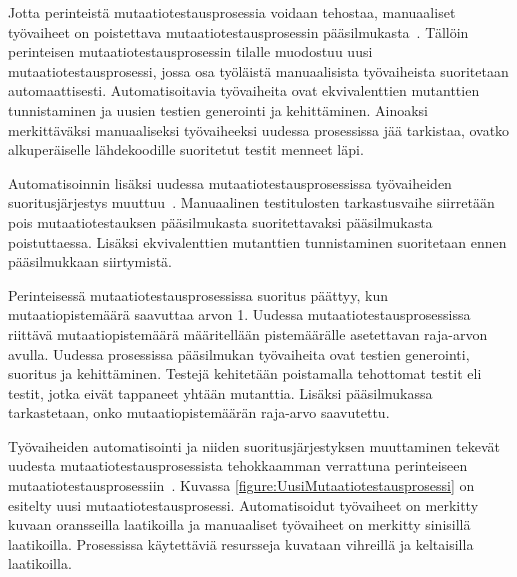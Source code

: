 \documentclass[finnish, grading]{tktltiki2}
\theoremstyle{definition}
\theoremstyle{remark}
\begin{document}
Jotta perinteistä mutaatiotestausprosessia voidaan tehostaa, manuaaliset työvaiheet on poistettava mutaatiotestausprosessin pääsilmukasta~\cite[s. 41]{Offutt:Untch:2001}. Tällöin perinteisen mutaatiotestausprosessin tilalle muodostuu uusi mutaatiotestausprosessi, jossa osa työläistä manuaalisista työvaiheista suoritetaan automaattisesti. Automatisoitavia työvaiheita ovat ekvivalenttien mutanttien tunnistaminen ja uusien testien generointi ja kehittäminen. Ainoaksi merkittäväksi manuaaliseksi työvaiheeksi uudessa prosessissa jää tarkistaa, ovatko alkuperäiselle lähdekoodille suoritetut testit menneet läpi.

Automatisoinnin lisäksi uudessa mutaatiotestausprosessissa työvaiheiden suoritusjärjestys muuttuu~\cite[s. 40]{Offutt:Untch:2001}. Manuaalinen testitulosten tarkastusvaihe siirretään pois mutaatiotestauksen pääsilmukasta suoritettavaksi pääsilmukasta poistuttaessa. Lisäksi ekvivalenttien mutanttien tunnistaminen suoritetaan ennen pääsilmukkaan siirtymistä. 

Perinteisessä mutaatiotestausprosessissa suoritus päättyy, kun mutaatiopistemäärä saavuttaa arvon 1. Uudessa mutaatiotestausprosessissa riittävä mutaatiopistemäärä määritellään pistemäärälle asetettavan raja-arvon avulla. Uudessa prosessissa pääsilmukan työvaiheita ovat testien generointi, suoritus ja kehittäminen. Testejä kehitetään poistamalla tehottomat testit eli testit, jotka eivät tappaneet yhtään mutanttia. Lisäksi pääsilmukassa tarkastetaan, onko mutaatiopistemäärän raja-arvo saavutettu. 

Työvaiheiden automatisointi ja niiden suoritusjärjestyksen muuttaminen tekevät uudesta mutaatiotestausprosessista tehokkaamman verrattuna perinteiseen mutaatiotestausprosessiin~\cite[s. 41]{Offutt:Untch:2001}. Kuvassa \ref{figure:UusiMutaatiotestausprosessi} on esitelty uusi mutaatiotestausprosessi. Automatisoidut työvaiheet on merkitty kuvaan oransseilla laatikoilla ja manuaaliset työvaiheet on merkitty sinisillä laatikoilla. Prosessissa käytettäviä resursseja kuvataan vihreillä ja keltaisilla laatikoilla.
\end{document}
